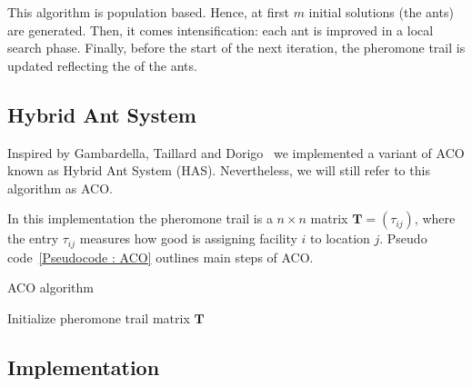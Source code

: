 This algorithm is population based. Hence, at first $m$ initial solutions (the ants) are generated. Then, it comes intensification: each ant is improved in a local search phase. Finally, before the start of the next iteration, the pheromone trail is updated reflecting the  of the ants.

\subsection{Hybrid Ant System}


Inspired by Gambardella, Taillard and Dorigo~\cite{Gambardella1999} we implemented a variant of ACO known as Hybrid Ant System (HAS). Nevertheless, we will still refer to this algorithm as ACO.

In this implementation the pheromone trail is a $n \times n$ matrix $\bm T=(\tau_{ij})$, where the entry $\tau_{ij}$ measures how good is assigning facility $i$ to location $j$.
Pseudo code~\ref{Pseudocode : ACO} outlines main steps of ACO.
\begin{algorithm}
	\caption{ACO algorithm}
	\label{Pseudocode : ACO}
Initialize pheromone trail matrix $\bm T$\;

\end{algorithm}

\subsection{Implementation}

